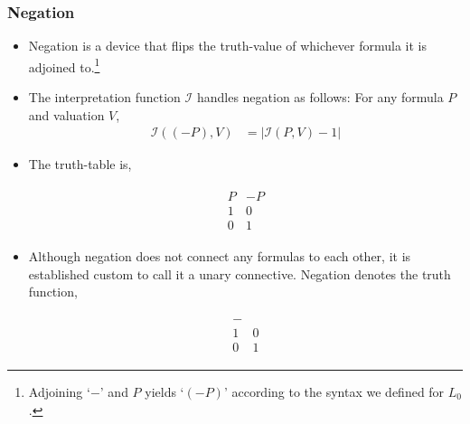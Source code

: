 \documentclass[11pt]{article}
\begin{document}
\subsubsection{Negation}

\begin{itemize}

\item Negation is a device that flips the truth-value of whichever formula it is
adjoined to.\footnote{Adjoining `$-$' and $P$ yields `$(-P)$' according to the
syntax we defined for $L_0$.} 

\item The interpretation function $\mathcal{I}$ handles negation as follows: For
any formula $P$ and valuation $V$,
\begin{align}
\mathcal{I}((-P),V) &= |\mathcal{I}(P,V) - 1|
\end{align}

\item The truth-table is,

\begin{align}
\begin{array}{c|c}
P & -P \\ \hline
1 & 0 \\
0 & 1 
\end{array}
\end{align}

\item Although negation does not connect any formulas to each other, it is
established custom to call it a unary connective. Negation denotes the truth
function,

\begin{align}
\begin{array}{c|c}
- & \\ \hline
1 & 0 \\
0 & 1 
\end{array}
\end{align}

\end{itemize}
\end{document}
